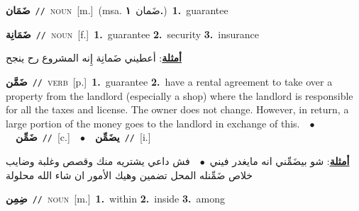 \documentclass[10pt,a4paper,twoside]{article} %
\begin{document}
\begin{multicols}{2}
{\setlength\topsep{0pt}\textbf{\foreignlanguage{arabic}{ضَمَان}}\ {\color{gray}\texttt{//}\color{black}}\ \textsc{noun}\ [m.]\ \color{gray}(msa. \foreignlanguage{arabic}{ضَمان}~\foreignlanguage{arabic}{\textbf{١.}})\color{black}\ \textbf{1.}~guarantee\ } \vspace{2mm}

{\setlength\topsep{0pt}\textbf{\foreignlanguage{arabic}{ضَمَانِة}}\ {\color{gray}\texttt{//}\color{black}}\ \textsc{noun}\ [f.]\ \textbf{1.}~guarantee  \textbf{2.}~security  \textbf{3.}~insurance\  \begin{flushright}\color{gray}\foreignlanguage{arabic}{\textbf{\underline{\foreignlanguage{arabic}{أمثلة}}}: أعطيني ضَمانِة إِنه المشروع رح ينجح}\end{flushright}\color{black}} \vspace{2mm}

{\setlength\topsep{0pt}\textbf{\foreignlanguage{arabic}{ضَمَّن}}\ {\color{gray}\texttt{//}\color{black}}\ \textsc{verb}\ [p.]\ \textbf{1.}~guarantee  \textbf{2.}~have a rental agreement to take over a property from the landlord  (especially a shop) where the landlord is responsible for all the taxes and license. The owner does not change. However, in return, a large portion of the money goes to the landlord in exchange of this.\ \ $\bullet$\ \ \setlength\topsep{0pt}\textbf{\foreignlanguage{arabic}{ضَمِّن}}\ {\color{gray}\texttt{//}\color{black}}\ [c.]\ \ $\bullet$\ \ \setlength\topsep{0pt}\textbf{\foreignlanguage{arabic}{يضَمِّن}}\ {\color{gray}\texttt{//}\color{black}}\ [i.]\  \begin{flushright}\color{gray}\foreignlanguage{arabic}{\textbf{\underline{\foreignlanguage{arabic}{أمثلة}}}: شو بيضَمِّني انه مايغدر فيني\ $\bullet$\ \  فش داعي يشتريه منك وقصص وغلبة وضايب خلاص ضَمِّنله المحل تضمين وهيك الأمور ان شاء الله محلولة}\end{flushright}\color{black}} \vspace{2mm}

{\setlength\topsep{0pt}\textbf{\foreignlanguage{arabic}{ضِمِن}}\ {\color{gray}\texttt{//}\color{black}}\ \textsc{noun}\ [m.]\ \textbf{1.}~within  \textbf{2.}~inside  \textbf{3.}~among\ } \vspace{2mm}


\end{multicols}
\end{document}
